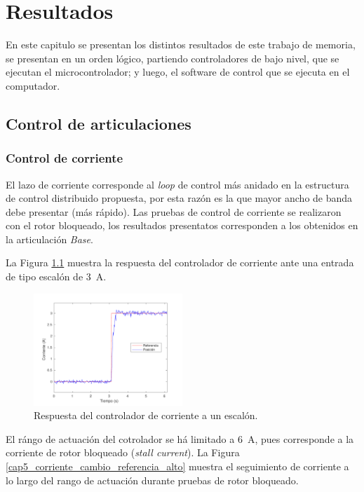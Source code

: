 \chapter{Resultados}

En este capitulo se presentan los distintos resultados de este trabajo de memoria, se presentan en un orden lógico, partiendo controladores de bajo nivel, que se ejecutan el microcontrolador; y luego, el software de control que se ejecuta en el computador.

\section{Control de articulaciones}

\subsection{Control de corriente}

El lazo de corriente corresponde al \textit{loop} de control más anidado en la estructura de control distribuido propuesta, por esta razón es la que mayor ancho de banda debe presentar (más rápido). Las pruebas de control de corriente se realizaron con el rotor bloqueado, los resultados presentatos corresponden a los obtenidos en la articulación \textit{Base}.

La Figura \ref{cap5_step_corriente} muestra la respuesta del controlador de corriente ante una entrada de tipo escalón de \SI{3}{\ampere}.

\begin{figure}[ht]
  \centering
  \includegraphics[width=0.5\textwidth]{img/cap5/step_corriente.pdf}
  \caption{Respuesta del controlador de corriente a un escalón.}
  \label{cap5_step_corriente}
\end{figure}

El rángo de actuación del cotrolador se há limitado a \SI{6}{\ampere}, pues corresponde a la corriente de rotor bloqueado (\textit{stall current}). La Figura \ref{cap5_corriente_cambio_referencia_alto} muestra el seguimiento de corriente a lo largo del rango de actuación durante pruebas de rotor bloqueado.

